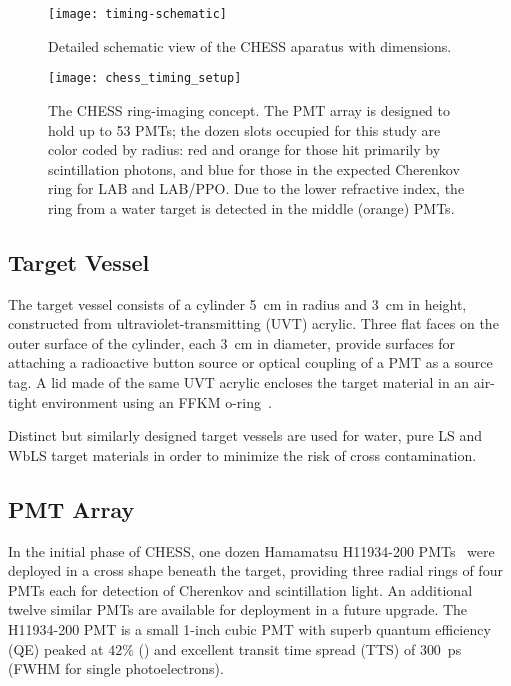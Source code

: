 \begin{figure}
\centering
\texttt{[image: timing-schematic]}
\caption{Detailed schematic view of the CHESS aparatus with dimensions.}
\label{fig:timing-setup}
\end{figure}

\begin{figure}
\centering
\texttt{[image: chess\_timing\_setup]}
\caption{The CHESS ring-imaging concept. The PMT array is designed to hold up to 53 PMTs; the dozen slots occupied for this study are color coded by radius: red and orange for those hit primarily by scintillation photons, and blue for those in the expected Cherenkov ring for LAB and LAB/PPO. Due to the lower refractive index, the ring from a water target is detected in the middle (orange) PMTs. }
\label{fig:timing-setup-2}
\end{figure}

\subsection{Target Vessel}
The target vessel  consists of a cylinder 5~cm in radius and 3~cm in height, constructed from ultraviolet-transmitting (UVT) acrylic. Three flat faces on the outer surface of the cylinder, each 3~cm in diameter, provide surfaces for attaching a radioactive button source or optical coupling of a PMT as a source tag. A lid made of the same UVT acrylic encloses the target material in an air-tight environment using an FFKM o-ring~\cite{cog-oring}. 

Distinct but similarly designed target vessels are used for water, pure LS and WbLS target materials in order to minimize the risk of cross contamination.

\subsection{PMT Array}

\label{pmtarray}
In the initial phase of CHESS, one dozen Hamamatsu H11934-200 PMTs~\cite{h11934} were deployed in a cross shape beneath the target, providing three radial rings of four PMTs each for detection of Cherenkov and scintillation light.  An additional twelve similar PMTs are available for deployment in a future upgrade.  The H11934-200 PMT is a small 1-inch cubic PMT with superb quantum efficiency (QE) peaked at $42\%$ () and excellent transit time spread (TTS) of 300~ps (FWHM for single photoelectrons).

